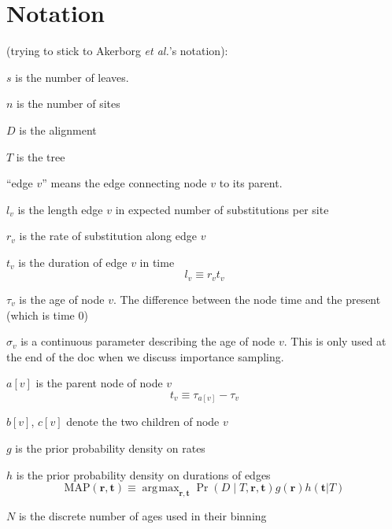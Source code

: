 \documentclass{llncs}
\newcommand{\etal}[0]{{\em et al.}\xspace}
\newcommand{\numLeaves}[0]{\ensuremath{s}\xspace}
\newcommand{\numSites}[0]{\ensuremath{n}\xspace}
\newcommand{\dataMatrix}[0]{\ensuremath{D}\xspace}
\newcommand{\tree}[0]{\ensuremath{T}\xspace}
\newcommand{\edgeLen}[1]{\ensuremath{l_{#1}}\xspace}
\newcommand{\rate}[1]{\ensuremath{r_{#1}}\xspace}
\newcommand{\ratevec}[0]{\ensuremath{\mathbf{r}}\xspace}
\newcommand{\timevec}[0]{\ensuremath{\mathbf{t}}\xspace}
\newcommand{\contTime}[1]{\ensuremath{\sigma}_{#1}\xspace}
\newcommand{\duration}[1]{\ensuremath{t_{#1}}\xspace}
\newcommand{\age}[1]{\ensuremath{\tau_{#1}}\xspace}
\newcommand{\parent}[1]{\ensuremath{a[{#1}]}\xspace}
\newcommand{\firstChild}[1]{\ensuremath{b[{#1}]}\xspace}
\newcommand{\secondChild}[1]{\ensuremath{c[{#1}]}\xspace}
\newcommand{\ratePriorDensity}[0]{\ensuremath{g}\xspace}
\newcommand{\timePriorDensity}[0]{\ensuremath{h}\xspace}
\newcommand{\numAges}[0]{\ensuremath{N}\xspace}
\DeclareMathOperator*{\argmax}{\arg\!\max}
\begin{document}
\section{Notation}
(trying to stick to Akerborg \etal's notation):
\begin{compactitem}
    \item[\numLeaves] is the number of leaves.
    \item[\numSites] is the number of sites
    \item[\dataMatrix] is the alignment
    \item[\tree] is the tree
    \item[``edge $v$''] means the edge connecting node $v$ to its parent.
    \item[\edgeLen{v}] is the length edge $v$ in expected number of substitutions per site
    \item[\rate{v}] is the rate of substitution along edge $v$
    \item[\duration{v}] is the duration of edge $v$ in time
\begin{equation}
    \edgeLen{v} \equiv \rate{v}\duration{v}
\end{equation}
    \item[\age{v}] is the age of node $v$. The difference between the node time and the present (which is time 0)
    \item[$\contTime{v}$] is a continuous parameter describing the age of node $v$. This is only used at the end of the doc when we discuss importance sampling.
    \item[\parent{v}] is the parent node of node $v$
\begin{equation}
    \duration{v} \equiv \age{\parent{v}} - \age{v}
\end{equation}
    \item[\firstChild{v}, \secondChild{v}] denote the two children of node $v$
    \item[\ratePriorDensity] is the prior probability density on rates
    \item[\timePriorDensity] is the prior probability density on durations of edges
\begin{equation}
    \mbox{MAP}(\ratevec, \timevec)  \equiv \argmax_{\ratevec, \timevec} \Pr\left(\dataMatrix \mid \tree, \ratevec, \timevec\right) \ratePriorDensity(\ratevec) \timePriorDensity(\timevec | T)
\end{equation}
    \item[\numAges] is the discrete number of ages used in their binning
\end{compactitem}
\end{document}
